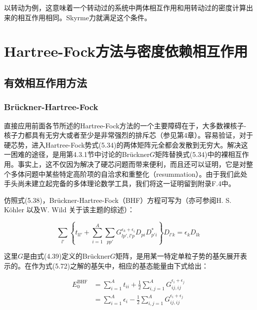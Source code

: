 以转动为例，这意味着一个转动过的系统中两体相互作用和用转动过的密度计算出来的相互作用相同。Skyrme力就满足这个条件。

\section{Hartree-Fock方法与密度依赖相互作用\label{sec:Hartree-Fock=0065B9=006CD5=004E0E=005BC6=005EA6=004F9D=008D56=0076F8=004E92=004F5C=007528}}

\subsection{有效相互作用方法\label{subsec:=006709=006548=0076F8=004E92=004F5C=007528=0065B9=006CD5}}

\subsubsection{Brückner-Hartree-Fock\label{subsubsec:Brueckner-Hartree-Fock}}

直接应用前面各节所述的Hartree-Fock方法的一个主要障碍在于，大多数裸核子-核子力都具有无穷大或者至少是非常强烈的排斥芯（参见第4章）。容易验证，对于硬芯势，进入Hartree-Fock势式(5.34)的两体矩阵元全都会发散到无穷大。解决这一困难的途径，是用第4.3.1节中讨论的Brückner$G$矩阵替换式(5.34)中的裸相互作用。事实上，这不仅因为解决了硬芯问题而带来便利，而且还可以证明，它是对整个多体问题中某些特定高阶项的自洽求和重整化（resummation）。由于我们此处手头尚未建立起完备的多体理论数学工具，我们将这一证明留到附录F.4中。

仿照式(5.38)，Brückner-Hartree-Fock（BHF）方程可写为（亦可参阅H. S. Köhler \cite{Ko75}以及W.
Wild \cite{Wi77}关于该主题的综述）：

\begin{equation}
\sum_{l'}\left\{ t_{ll'}+\sum^{A}_{i=1}\sum_{pp'}G^{\epsilon_{k}+\epsilon_{i}}_{lp',l'p}D_{pi}D^{*}_{p'i}\right\} D_{l'k}=\epsilon_{k}D_{lk}\label{eq:bhf_equation}
\end{equation}

这里$G$是由式(4.39)定义的Brückner$G$矩阵，是用某一特定单粒子势的基矢展开表示的。在作为式(5.72)之解的基矢中，相应的基态能量由下式给出：

\begin{align}
E^{\mathrm{BHF}}_{0} & =\sum^{A}_{i=1}t_{ii}+\frac{1}{2}\sum^{A}_{i,j=1}G^{\epsilon_{i}+\epsilon_{j}}_{ij,ij}\label{eq:bhf_e0_t}\\
 & =\sum^{A}_{i=1}\epsilon_{i}-\frac{1}{2}\sum^{A}_{i,j=1}G^{\epsilon_{i}+\epsilon_{j}}_{ij,ij}\label{eq:bhf_e0_eps}
\end{align}

